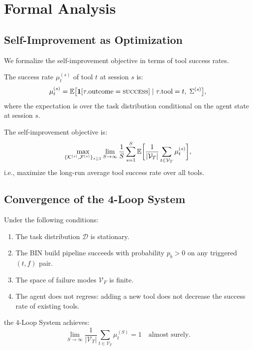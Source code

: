 \section{Formal Analysis}

\label{sec:analysis}

\subsection{Self-Improvement as Optimization}

We formalize the self-improvement objective in terms of tool success rates.

\begin{definition}
\label{def:success_rate}
The success rate $\mu_t^{(s)}$ of tool $t$ at session $s$ is:
\begin{equation}
\mu_t^{(s)} = \operatorname{\mathbb{E}}\bigl[\mathbf{1}[\tau.\text{outcome}=\textsc{success}]
               \mid \tau.\text{tool}=t,\; \Sigma^{(s)}\bigr],
\end{equation}
where the expectation is over the task distribution conditional on the agent
state at session $s$.
\end{definition}

\begin{definition}
\label{def:objective}
The self-improvement objective is:
\begin{equation}
\max_{\{\mathcal{K}^{(s)}, \mathcal{F}^{(s)}\}_{s \geq 1}} \lim_{S \to \infty}
\frac{1}{S} \sum_{s=1}^{S} \operatorname{\mathbb{E}}\biggl[\frac{1}{|\mathcal{V}_T|} \sum_{t \in \mathcal{V}_T} \mu_t^{(s)}\biggr],
\end{equation}
i.e., maximize the long-run average tool success rate over all tools.
\end{definition}

\subsection{Convergence of the 4-Loop System}

\begin{theorem}
\label{thm:convergence}
Under the following conditions:
\begin{enumerate}[leftmargin=1.5em, nosep]
    \item[\textbf{(A1)}] The task distribution $\mathcal{D}$ is stationary.
    \item[\textbf{(A2)}] The BIN build pipeline succeeds with probability $p_b > 0$
          on any triggered $(t,f)$ pair.
    \item[\textbf{(A3)}] The space of failure modes $\mathcal{V}_F$ is finite.
    \item[\textbf{(A4)}] The agent does not regress: adding a new tool does not
          decrease the success rate of existing tools.
\end{enumerate}
the 4-Loop System achieves:
\begin{equation}
\lim_{S \to \infty} \frac{1}{|\mathcal{V}_T|} \sum_{t \in \mathcal{V}_T} \mu_t^{(S)} = 1
\quad \text{almost surely.}
\end{equation}
\end{theorem}

